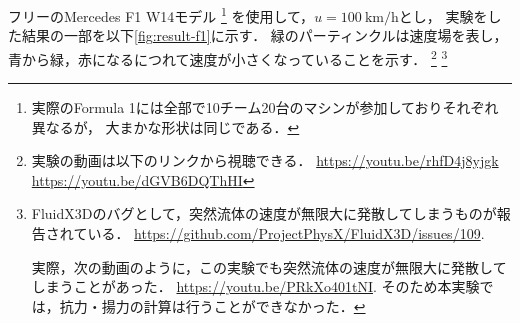 フリーのMercedes F1 W14モデル
\footnote{
    実際のFormula 1には全部で10チーム20台のマシンが参加しておりそれぞれ異なるが，
    大まかな形状は同じである．
}
を使用して，$u=\SI{100}{\kilo\meter\per\hour}$とし，
実験をした結果の一部を以下\ref{fig:result-f1}に示す．
緑のパーティンクルは速度場を表し，青から緑，赤になるにつれて速度が小さくなっていることを示す．
\footnote{
    実験の動画は以下のリンクから視聴できる．
    \url{https://youtu.be/rhfD4j8yjgk}
    \url{https://youtu.be/dGVB6DQThHI}
}
\footnote{
    FluidX3Dのバグとして，突然流体の速度が無限大に発散してしまうものが報告されている．
    \url{https://github.com/ProjectPhysX/FluidX3D/issues/109}.

    実際，次の動画のように，この実験でも突然流体の速度が無限大に発散してしまうことがあった．
    \url{https://youtu.be/PRkXo401tNI}.
    そのため本実験では，抗力・揚力の計算は行うことができなかった．

}



